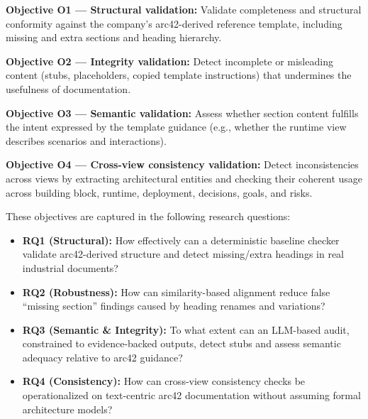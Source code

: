 \textbf{Objective O1 --- Structural validation:} Validate completeness and structural conformity against the company’s arc42-derived reference template, including missing and extra sections and heading hierarchy.

\textbf{Objective O2 --- Integrity validation:} Detect incomplete or misleading content (stubs, placeholders, copied template instructions) that undermines the usefulness of documentation.

\textbf{Objective O3 --- Semantic validation:} Assess whether section content fulfills the intent expressed by the template guidance (e.g., whether the runtime view describes scenarios and interactions).

\textbf{Objective O4 --- Cross-view consistency validation:} Detect inconsistencies across views by extracting architectural entities and checking their coherent usage across building block, runtime, deployment, decisions, goals, and risks.

These objectives are captured in the following research questions:
\begin{itemize}
    \item \textbf{RQ1 (Structural):} How effectively can a deterministic baseline checker validate arc42-derived structure and detect missing/extra headings in real industrial documents?
    \item \textbf{RQ2 (Robustness):} How can similarity-based alignment reduce false ``missing section'' findings caused by heading renames and variations?
    \item \textbf{RQ3 (Semantic \& Integrity):} To what extent can an LLM-based audit, constrained to evidence-backed outputs, detect stubs and assess semantic adequacy relative to arc42 guidance?
    \item \textbf{RQ4 (Consistency):} How can cross-view consistency checks be operationalized on text-centric arc42 documentation without assuming formal architecture models?
\end{itemize}

